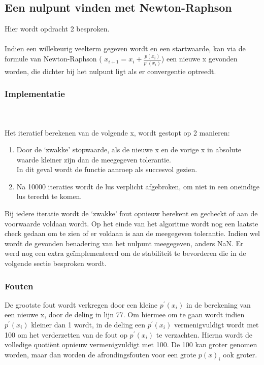 \documentclass[a4paper,kulak]{kulakarticle}
\begin{document}
\subsection{Een nulpunt vinden met Newton-Raphson}
Hier wordt opdracht 2 besproken.
\\~\\
Indien een willekeurig veelterm gegeven wordt en een startwaarde, kan via de formule van Newton-Raphson (
$x_{i+1} = x_i + \frac{ p(x_i) }{ p^{'}(x_i) }$) een nieuwe x gevonden worden, die dichter bij het nulpunt ligt als er convergentie optreedt.

\subsubsection{Implementatie}


~\\~\\
Het iteratief berekenen van de volgende x, wordt gestopt op 2 manieren:
\begin{enumerate}
	\item Door de `zwakke' stopwaarde, als de nieuwe x en de vorige x in absolute waarde kleiner zijn dan de meegegeven tolerantie.\\
	In dit geval wordt de functie aanroep als succesvol gezien.
	\item Na 10000 iteraties wordt de lus verplicht afgebroken, om niet in een oneindige lus terecht te komen.
\end{enumerate}

Bij iedere iteratie wordt de `zwakke' fout opnieuw berekent en gecheckt of aan de voorwaarde voldaan wordt.
Op het einde van het algoritme wordt nog een laatste check gedaan om te zien of er voldaan is aan de meegegeven tolerantie. Indien wel wordt de gevonden benadering van het nulpunt meegegeven, anders NaN.
Er werd nog een extra geïmplementeerd om de stabiliteit te bevorderen die in de volgende sectie besproken wordt.

\subsubsection{Fouten}
De grootste fout wordt verkregen door een kleine $p^{'}(x_i)$ in de berekening van een nieuwe x, door de deling in lijn 77. Om hiermee om te gaan wordt indien $p^{'}(x_i)$ kleiner dan 1 wordt, in de deling een $p^{'}(x_i)$ vermenigvuldigt wordt met 100 om het verderzetten van de fout op $p^{'}(x_i)$ te verzachten. Hierna wordt de volledige quotiënt opnieuw vermenigvuldigt met 100. De 100 kan groter genomen worden, maar dan worden de afrondingsfouten voor een grote $p(x)_i$ ook groter.
\end{document}
